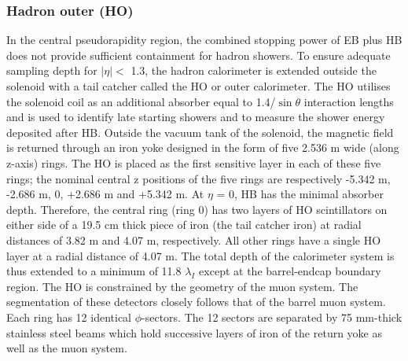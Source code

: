 \subsubsection{Hadron outer (HO)}
In the central pseudorapidity region, the combined stopping power of EB plus HB does not provide sufficient containment for hadron showers. To ensure adequate sampling depth for $|\eta|<$ 1.3, the hadron calorimeter is extended outside the solenoid with a tail catcher called the HO or outer calorimeter. The HO utilises the solenoid coil as an additional absorber equal to 1.4/$\sin \theta$ interaction lengths and is used to identify late starting showers and to measure the shower energy deposited after HB.
Outside the vacuum tank of the solenoid, the magnetic field is returned through an iron yoke designed in the form of five 2.536 m wide (along z-axis) rings. The HO is placed as the first sensitive layer in each of these five rings; the nominal central z positions of the five rings are respectively -5.342 m, -2.686 m, 0, +2.686 m and +5.342 m. At $\eta$ = 0, HB has the minimal absorber depth. Therefore, the central ring (ring 0) has two layers of HO scintillators on either side of a 19.5 cm thick piece of iron (the tail catcher iron) at radial distances of 3.82 m and 4.07 m, respectively. All other rings have a single HO layer at a radial distance of 4.07 m. The total depth of the calorimeter system is thus extended to a minimum of 11.8 $\lambda_{I}$ except at the barrel-endcap boundary region. The HO is constrained by the geometry of the muon system. The segmentation of these detectors closely follows that of the barrel muon system. Each ring has 12 identical $\phi$-sectors. The 12 sectors are separated by 75 mm-thick stainless steel beams which hold successive layers of iron of the return yoke as well as the muon system. 

